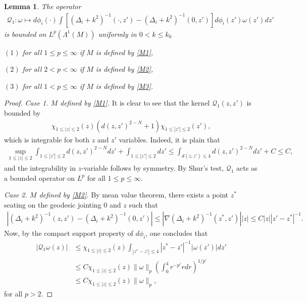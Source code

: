\documentclass[12pt]{amsart}
\newtheorem{lemma}[theorem]{Lemma}
\begin{document}
\begin{lemma}\label{lemma_bad2}
The operator
\begin{align*}
    \mathcal{Q}_1: \omega \mapsto d\phi_i(\cdot) \int \left[(\Delta_i +k^2)^{-1}(\cdot, z') - (\Delta_i+k^2)^{-1}(0,z') \right] d\phi_i(z') \omega(z') dz'
\end{align*}
is bounded on $L^p(\Lambda^1(M))$ uniformly in $0<k\le k_0$

$(1)$ for all $1\le p\le \infty$  if $M$ is defined by \eqref{M1},

$(2)$ for all $2<p<\infty$ if $M$ is defined by \eqref{M2},

$(3)$ for all $1<p\le \infty$ if $M$ is defined by \eqref{M3}.
\end{lemma}

\begin{proof}

\textit{Case 1. $M$ defined by \eqref{M1}.}
It is clear to see that the kernel $\mathcal{Q}_1(z,z')$ is bounded by
\begin{align*}
    \chi_{1\le |z|\le 2}(z) \left( d(z,z')^{2-N} + 1     \right) \chi_{1\le |z'|\le 2}(z'),
\end{align*}
which is integrable for both $z$ and $z'$ variables. Indeed, it is plain that
\begin{align*}
    \sup_{1\le |z| \le 2} \int_{1\le |z'| \le 2} d(z,z')^{2-N} dz' + \int_{1\le |z'| \le 2} dz' \le \int_{d(z,z')\le 4} d(z,z')^{2-N} dz' +C \le C,
\end{align*}
and the integrability in $z$-variable follows by symmetry. By Shur's test, $\mathcal{Q}_1$ acts as a bounded operator on $L^p$ for all $1\le p\le \infty$.

\textit{Case 2. $M$ defined by \eqref{M2}.}
By mean value theorem, there exists a point $z^*$ seating on the geodesic jointing $0$ and $z$ such that
\begin{align*}
\left|(\Delta_i +k^2)^{-1}(z, z') - (\Delta_i+k^2)^{-1}(0,z') \right| \le \left|\nabla (\Delta_i + k^2)^{-1}(z^*,z') \right| |z| \le C|z| |z'-z^*|^{-1}.
\end{align*}
Now, by the compact support property of $d\phi_i$, one concludes that
\begin{align*}
    |\mathcal{Q}_1\omega(z)| &\le \chi_{1\le |z|\le 2}(z) \int_{|z^* - z'|\le 4} |z^* - z'|^{-1} |\omega(z')| dz'\\
    &\le C \chi_{1\le |z|\le 2}(z) \|\omega\|_p \left( \int_0^4 r^{-p'} rdr \right)^{1/p'}\\
    &\le C \chi_{1\le |z|\le 2}(z) \|\omega\|_p,
\end{align*}
for all $p>2$.


\end{proof}
\end{document}
